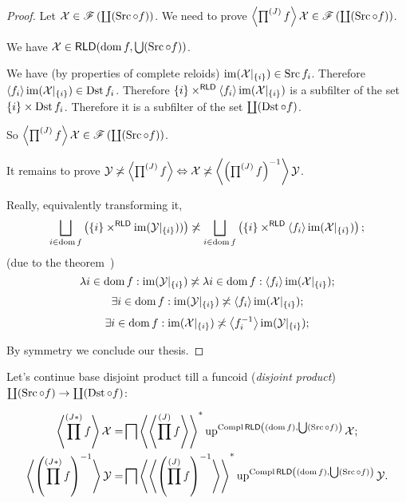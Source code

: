 \begin{proof}
Let $\mathcal{X}\in\mathscr{F}\left(\coprod(\operatorname{Src}\circ f)\right)$.
We need to prove
$\left\langle \prod^{(J)}f\right\rangle \mathcal{X}\in\mathscr{F}\left(\coprod(\operatorname{Src}\circ f)\right)$.

We have $\mathcal{X}\in\mathsf{RLD}(\operatorname{dom} f, \bigcup(\operatorname{Src}\circ f))$.

We have (by properties of complete reloids) $\operatorname{im}(\mathcal{X}|_{\{i\}})\in\operatorname{Src} f_i$. Therefore $\left\langle f_i\right\rangle\operatorname{im}(\mathcal{X}|_{\{i\}})\in\operatorname{Dst} f_i$. Therefore
$\{i\}\times^{\mathsf{RLD}}\left\langle f_i\right\rangle\operatorname{im}(\mathcal{X}|_{\{i\}})$ is a subfilter of the set $\{i\}\times\operatorname{Dst} f_i$. Therefore it is a subfilter of the set $\coprod(\operatorname{Dst}\circ f)$.

So $\left\langle \prod^{(J)}f\right\rangle \mathcal{X}\in\mathscr{F}\left(\coprod(\operatorname{Src}\circ f)\right)$.

It remains to prove
$\mathcal{Y}\not\asymp\left\langle \prod^{(J)}f\right\rangle \Leftrightarrow
\mathcal{X}\not\asymp\left\langle \left(\prod^{(J)}f\right)^{-1}\right\rangle \mathcal{Y}$.

Really, equivalently transforming it, \[ \bigsqcup_{i\in\dom f}
\left(\{i\}\times^{\mathsf{RLD}}\im(\mathcal{Y}|_{\{i\}}))\right) \nasymp \bigsqcup_{i\in\dom f}
\left(\{i\}\times^{\mathsf{RLD}}\supfun{f_i}\im(\mathcal{X}|_{\{i\}})\right); \]
(due to the theorem~)
\[
\lambda i\in\operatorname{dom} f:\operatorname{im}(\mathcal{Y}|_{\{i\}}) \not\asymp
\lambda i\in\operatorname{dom} f:\left\langle f_i\right\rangle\operatorname{im}(\mathcal{X}|_{\{i\}});
\]
\[
\exists i\in\operatorname{dom} f:\operatorname{im}(\mathcal{Y}|_{\{i\}}) \not\asymp
\left\langle f_i\right\rangle\operatorname{im}(\mathcal{X}|_{\{i\}});
\]
\[
\exists i\in\operatorname{dom} f:\operatorname{im}(\mathcal{X}|_{\{i\}}) \not\asymp
\left\langle f_i^{-1}\right\rangle\operatorname{im}(\mathcal{Y}|_{\{i\}});
\]

By symmetry we conclude our thesis.
\end{proof}

\begin{defn}
Let's continue base disjoint product till
a funcoid (\emph{disjoint product}) $\coprod(\operatorname{Src}\circ f)\to\coprod(\operatorname{Dst}\circ f)$:
\end{defn}

\begin{align*}
\left\langle \prod^{(J\ast)} f\right\rangle\mathcal{X} =&
\bigsqcap\left\langle \left\langle \prod^{(J)}f\right\rangle\right\rangle ^{\ast}\operatorname{up}^{\operatorname{Compl}\mathsf{RLD}\left((\operatorname{dom} f),\bigcup(\operatorname{Src}\circ f)\right)}\mathcal{X};\\
\left\langle \left(\prod^{(J\ast)} f\right)^{-1}\right\rangle\mathcal{Y} =&
\bigsqcap\left\langle \left\langle \left(\prod^{(J)}f\right)^{-1}\right\rangle\right\rangle ^{\ast}\operatorname{up}^{\operatorname{Compl}\mathsf{RLD}\left((\operatorname{dom} f),\bigcup(\operatorname{Src}\circ f)\right)}\mathcal{Y}.
\end{align*}

